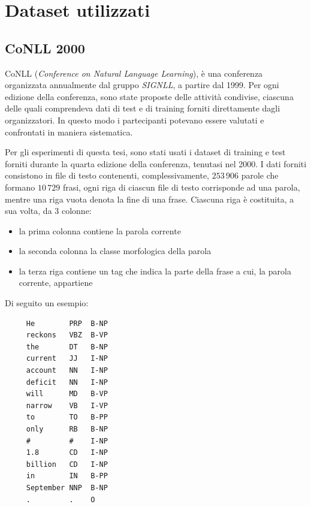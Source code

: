\section{Dataset utilizzati}
\nocite{Zanchetta:2005}
\nocite{Attardi:2008}

\subsection{CoNLL 2000}
CoNLL (\emph{Conference on Natural Language Learning}), \`e una conferenza organizzata annualmente dal gruppo \emph{SIGNLL}, a partire dal 1999.
Per ogni edizione della conferenza, sono state proposte delle attivit\`a condivise, ciascuna delle quali comprendeva dati di test e di training forniti direttamente dagli organizzatori.
In questo modo i partecipanti potevano essere valutati e confrontati in maniera sistematica.

Per gli esperimenti di questa tesi, sono stati usati i dataset di training e test forniti durante la quarta edizione della conferenza, tenutasi nel 2000.
I dati forniti consistono in file di testo contenenti, complessivamente, $253\,906$ parole che formano $10\,729$ frasi, ogni riga di ciascun file di testo corrisponde ad una parola, mentre una riga vuota denota la fine di una frase.
Ciascuna riga \`e costituita, a sua volta, da 3 colonne:
\begin{itemize}
  \item la prima colonna contiene la parola corrente
  \item la seconda colonna la classe morfologica della parola
  \item la terza riga contiene un tag che indica la parte della frase a cui, la parola corrente, appartiene
\end{itemize}

Di seguito un esempio:

\begin{center}
  \begin{minipage}{5cm}
    \begin{verbatim}
     He        PRP  B-NP
     reckons   VBZ  B-VP
     the       DT   B-NP
     current   JJ   I-NP
     account   NN   I-NP
     deficit   NN   I-NP
     will      MD   B-VP
     narrow    VB   I-VP
     to        TO   B-PP
     only      RB   B-NP
     #         #    I-NP
     1.8       CD   I-NP
     billion   CD   I-NP
     in        IN   B-PP
     September NNP  B-NP
     .         .    O
    \end{verbatim}
  \end{minipage}
\end{center}

